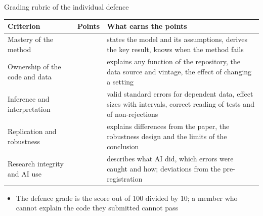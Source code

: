 \begin{frame}{Grading rubric of the individual defence}
\itemsize{\small}
\begin{center}
\scriptsize
\begin{tabular}{>{\raggedright\arraybackslash}p{3.2cm}>{\raggedleft\arraybackslash}p{1.1cm}>{\raggedright\arraybackslash}p{7.2cm}}
\toprule
\textbf{Criterion} & \textbf{Points} & \textbf{What earns the points} \\
\midrule
Mastery of the method & 25 & states the model and its assumptions, derives the key result, knows when the method fails \\
Ownership of the code and data & 20 & explains any function of the repository, the data source and vintage, the effect of changing a setting \\
Inference and interpretation & 25 & valid standard errors for dependent data, effect sizes with intervals, correct reading of tests and of non-rejections \\
Replication and robustness & 20 & explains differences from the paper, the robustness design and the limits of the conclusion \\
Research integrity and AI use & 10 & describes what AI did, which errors were caught and how; deviations from the pre-registration \\
\bottomrule
\end{tabular}
\end{center}
\begin{itemize}
    \item The defence grade is the score out of 100 divided by 10; a member who cannot explain the code they submitted cannot pass
\end{itemize}
\end{frame}

